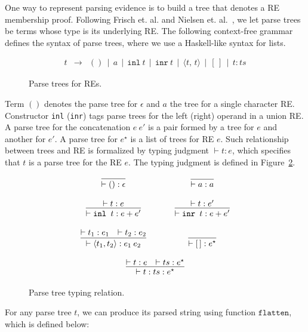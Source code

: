 \documentclass[oneside,12pt]{scrbook}
\theoremstyle{definition}
\newcommand{\flatten}{\ensuremath{\texttt{flatten}}}
\theoremstyle{plain}
\theoremstyle{definition}
\begin{document}
One way to represent parsing evidence is to build a tree that denotes
a RE membership proof. Following Frisch et. al. and Nielsen et.
al.~\cite{Lasse2011,Frisch2004},
we let parse trees be terms whose type is its underlying RE. The following context-free 
grammar defines the syntax of parse trees, where we use a Haskell-like syntax for 
lists.

\begin{figure}[h]
	\[
	\begin{array}{lcl}
	t & \to & () \,\mid\, a \,\mid\, \texttt{inl}\:t  \,\mid\, \texttt{inr}\:t  \,\mid\, \langle t,\,t\rangle  \,\mid\, [\,]\,\mid\,t : ts
	\end{array}
	\]
	\caption{Parse trees for REs.}
	\label{figure:parsetreesyntax}
\end{figure}

Term $()$ denotes the parse tree for $\epsilon$ and $a$ the tree for a single character RE. 
Constructor \texttt{inl} (\texttt{inr}) tags parse trees for the left (right) operand in 
a union RE. A parse tree for the concatenation $e\:e'$ is a pair formed by a tree for $e$ and 
another for $e'$. A parse tree for $e^\star$ is a list of trees for RE $e$. Such relationship 
between trees and RE is formalized by typing judgment $\vdash t : e$, which specifies that 
$t$ is a parse tree for the RE $e$. The typing judgment is defined in Figure~\ref{figure:parsetreetyping}.


\begin{figure}[h]
	\[ 
	\begin{array}{ccc}
	\infer{\vdash () : \epsilon}{} & \hspace{.5cm} & \infer{\vdash a : a}{}\\
	\\
	\infer{\vdash \texttt{inl }t : e + e'}{\vdash t : e}  & & 
	\infer{\vdash \texttt{inr }t : e + e'}{\vdash t : e'} \\ 
	\\
	\infer{\vdash \langle t_1, t_2 \rangle : e_1\:e_2}
	{\vdash t_1 : e_1 & \vdash t_2 : e_2}   & & 
	\infer{\vdash [\,] : e^\star}{} \\ \\
	\multicolumn{3}{c}{
		\infer{\vdash t : ts : e ^\star}
		{\vdash t : e & \vdash ts : e ^\star}
	}
	\end{array}
	\]
	\caption{Parse tree typing relation.}
	\label{figure:parsetreetyping}
\end{figure}


For any parse tree $t$, we can produce its parsed string using function 
\flatten, which is defined below:
\end{document}
